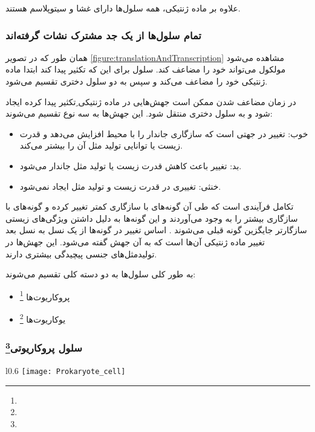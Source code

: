 \noindent
علاوه بر ماده ژنتیکی، همه سلول‌ها دارای  غشا و سیتوپلاسم هستند.

\subsubsection{تمام سلول‌ها از یک جد مشترک نشات گرفته‌اند}

همان طور که در تصویر
\ref{figure:translationAndTranscription}
مشاهده می‌شود مولکول
می‌تواند خود را مضاعف کند. سلول برای این که تکثیر پیدا کند ابتدا ماده ژنتیکی خود را مضاعف می‌کند و سپس به دو سلول دختری تقسیم می‌شود.

\noindent
در زمان مضاعف شدن ممکن است جهش‌هایی در ماده ژنتیکی ِتکثیر پیدا کرده ایجاد شود و به سلول دختری منتقل شود. این جهش‌ها به سه نوع تقسیم می‌شوند:

\begin{itemize}
\item خوب:
تغییر در جهتی است که سازگاری جاندار را با محیط افزایش می‌دهد و قدرت زیست  یا توانایی تولید مثل آن را بیشتر می‌کند.
\item بد:
تغییر باعث کاهش قدرت زیست یا تولید مثل جاندار می‌شود.
\item خنثی:
تغییری در قدرت زیست و تولید مثل ایجاد نمی‌شود.
\end{itemize}

تکامل فرآیندی است که طی آن گونه‌های با سازگاری کمتر تغییر کرده و گونه‌های با سازگاری بیشتر را به وجود می‌آوردند و این گونه‌ها به دلیل داشتن ویژگی‌های زیستی سازگارتر جایگزین گونه قبلی می‌شوند .
اساس تغییر در گونه‌ها از یک نسل به نسل بعد تغییر ماده ژنتیکی آن‌ها است  که به آن جهش گفته می‌شود. این جهش‌ها در تولید‌مثل‌های جنسی پیچیدگی بیشتری دارند.

\bigskip
به طور کلی سلول‌ها به دو دسته کلی تقسیم می‌شوند:
\begin{itemize}
\item پروکاریوت‌ها 
\footnote{}
\item یوکاریوت‌ها
\footnote{}
\end{itemize}

\subsubsection{سلول پروکاریوتی\protect\footnote{}}

\begin{wrapfigure}[17]{l}{0.6\textwidth}
	\centering
	\texttt{[image: Prokaryote\_cell]}
\end{wrapfigure}

